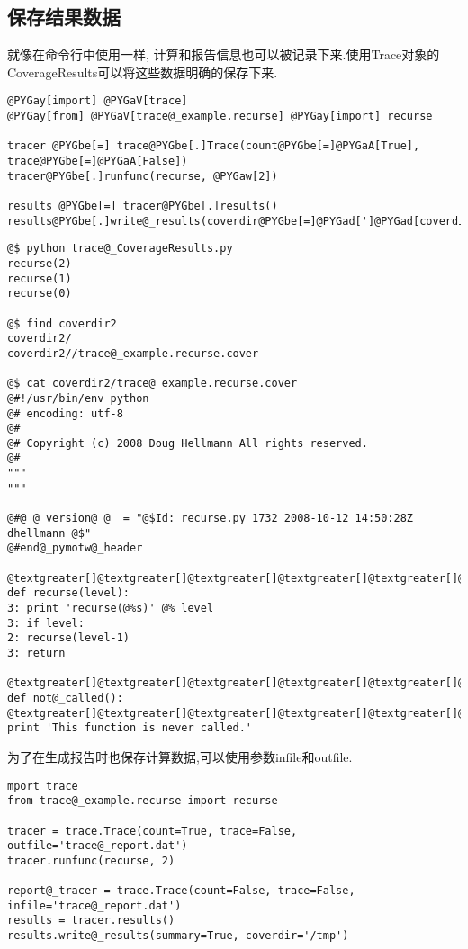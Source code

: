 \documentclass[a4paper,10pt,english]{manual}
\begin{document}
\subsection{保存结果数据}

就像在命令行中使用一样, 计算和报告信息也可以被记录下来.使用Trace对象的CoverageResults可以将这些数据明确的保存下来.

\begin{Verbatim}[commandchars=@\[\]]
@PYGay[import] @PYGaV[trace]
@PYGay[from] @PYGaV[trace@_example.recurse] @PYGay[import] recurse

tracer @PYGbe[=] trace@PYGbe[.]Trace(count@PYGbe[=]@PYGaA[True], trace@PYGbe[=]@PYGaA[False])
tracer@PYGbe[.]runfunc(recurse, @PYGaw[2])

results @PYGbe[=] tracer@PYGbe[.]results()
results@PYGbe[.]write@_results(coverdir@PYGbe[=]@PYGad[']@PYGad[coverdir2]@PYGad['])
\end{Verbatim}

\begin{Verbatim}[commandchars=@\[\]]
@$ python trace@_CoverageResults.py
recurse(2)
recurse(1)
recurse(0)

@$ find coverdir2
coverdir2/
coverdir2//trace@_example.recurse.cover

@$ cat coverdir2/trace@_example.recurse.cover
@#!/usr/bin/env python
@# encoding: utf-8
@#
@# Copyright (c) 2008 Doug Hellmann All rights reserved.
@#
"""
"""

@#@_@_version@_@_ = "@$Id: recurse.py 1732 2008-10-12 14:50:28Z dhellmann @$"
@#end@_pymotw@_header

@textgreater[]@textgreater[]@textgreater[]@textgreater[]@textgreater[]@textgreater[] def recurse(level):
3: print 'recurse(@%s)' @% level
3: if level:
2: recurse(level-1)
3: return

@textgreater[]@textgreater[]@textgreater[]@textgreater[]@textgreater[]@textgreater[] def not@_called():
@textgreater[]@textgreater[]@textgreater[]@textgreater[]@textgreater[]@textgreater[] print 'This function is never called.'
\end{Verbatim}

为了在生成报告时也保存计算数据,可以使用参数infile和outfile.

\begin{Verbatim}[commandchars=@\[\]]
mport trace
from trace@_example.recurse import recurse

tracer = trace.Trace(count=True, trace=False, outfile='trace@_report.dat')
tracer.runfunc(recurse, 2)

report@_tracer = trace.Trace(count=False, trace=False, infile='trace@_report.dat')
results = tracer.results()
results.write@_results(summary=True, coverdir='/tmp')
\end{Verbatim}
\end{document}
